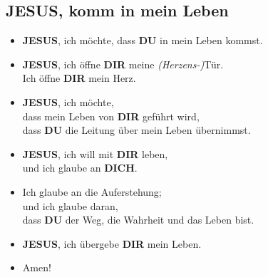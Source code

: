 \documentclass[10pt,a5paper]{article}
\newcommand{\Dich}[0]{\textbf{DICH}}
\newcommand{\Dir}[0]{\textbf{DIR}}
\newcommand{\Du}[0]{\textbf{DU}}
\newcommand{\Jesus}[0]{\textbf{JESUS}}
\begin{document}
	\subsection{{\Jesus}, komm in mein Leben}
		\begin{itemize}[nosep]
			\item	{\Jesus},
					ich m\"ochte,
					dass {\Du} in mein Leben kommst.
			\item	{\Jesus},
					ich \"offne {\Dir} meine \textit{(Herzens-)}T\"ur.
					\\
					Ich \"offne {\Dir} mein Herz.
			\item	{\Jesus},
					ich m\"ochte,
					\\
					dass mein Leben von {\Dir} gef\"uhrt wird,
					\\
					dass {\Du} die Leitung \"uber mein Leben \"ubernimmst.
			\item	{\Jesus},
					ich will mit {\Dir} leben,
					\\
					und ich glaube an {\Dich}.
			\item	Ich glaube an die Auferstehung;
					\\
					und ich glaube daran,
					\\
					dass {\Du} der Weg,
					die Wahrheit und das Leben bist.
			\item	{\Jesus},
					ich \"ubergebe {\Dir} mein Leben.
			\item	Amen!
		\end{itemize}
\end{document}
